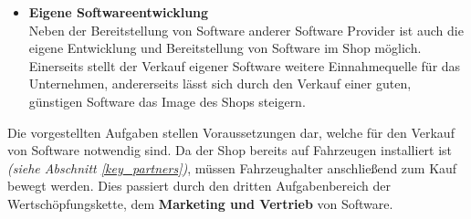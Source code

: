 \begin{itemize}
	\item[] \hspace{-0.6cm} \textbf{Eigene Softwareentwicklung}\\
	Neben der Bereitstellung von Software anderer Software Provider ist auch die eigene Entwicklung und Bereitstellung von Software im Shop möglich. Einerseits stellt der Verkauf eigener Software weitere Einnahmequelle für das Unternehmen, andererseits lässt sich durch den Verkauf einer guten, günstigen Software das Image des Shops steigern. 
\end{itemize}
Die vorgestellten Aufgaben stellen Voraussetzungen dar, welche für den Verkauf von Software notwendig sind. Da der Shop bereits auf Fahrzeugen installiert ist \textit{(siehe Abschnitt \ref{key_partners})}, müssen Fahrzeughalter anschließend zum Kauf bewegt werden. Dies passiert durch den dritten Aufgabenbereich der Wertschöpfungskette, dem \textbf{Marketing und Vertrieb} von Software.
